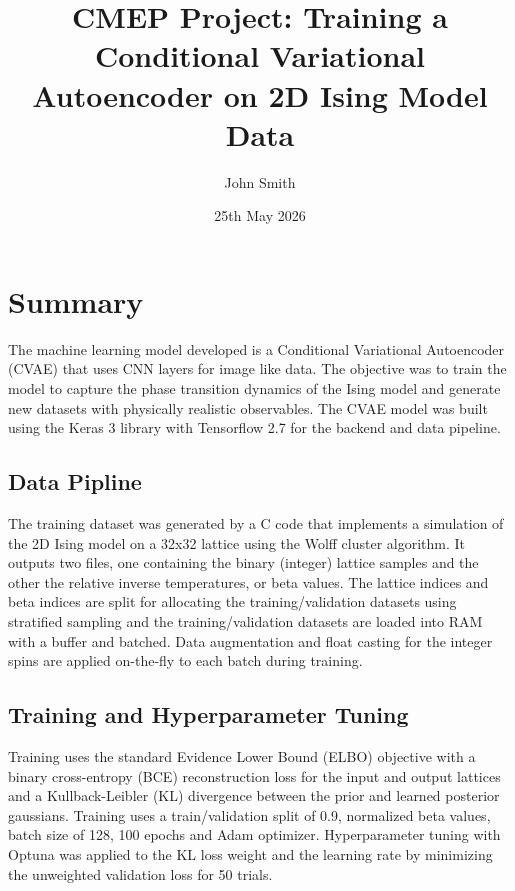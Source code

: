 \documentclass[11pt,a4paper]{article}
\title{\textbf{CMEP Project: Training a Conditional Variational Autoencoder on 2D Ising Model Data}}
\author{John Smith}
\date{25th May 2026}
\begin{document}
\maketitle
\vspace{-3em}

\section{Summary}
The machine learning model developed is a Conditional Variational Autoencoder (CVAE) that uses CNN layers for 
image like data. The objective was to train the model to capture the phase transition dynamics of the Ising 
model and generate new datasets with physically realistic observables. The CVAE model was built using the Keras 
3 library with Tensorflow 2.7 for the backend and data pipeline. 

\subsection{Data Pipline}
The training dataset was generated by a C code that implements a simulation of the 2D Ising model on a 32x32 
lattice using the Wolff cluster algorithm. It outputs two files, one containing the binary (integer) lattice 
samples and the other the relative inverse temperatures, or beta values. The lattice indices and beta indices 
are split for allocating the training/validation datasets using stratified sampling and the training/validation 
datasets are loaded into RAM with a buffer and batched. Data augmentation and float casting for the integer spins 
are applied on-the-fly to each batch during training.

\subsection{Training and Hyperparameter Tuning}
Training uses the standard Evidence Lower Bound (ELBO) objective with a binary cross-entropy (BCE) 
reconstruction loss for the input and output lattices and a Kullback-Leibler (KL) divergence between the prior 
and learned posterior gaussians. Training uses a train/validation split of 0.9, normalized beta values, batch 
size of 128, 100 epochs and Adam optimizer. Hyperparameter tuning with Optuna was applied to the KL loss weight 
and the learning rate by minimizing the unweighted validation loss for 50 trials.
\end{document}
